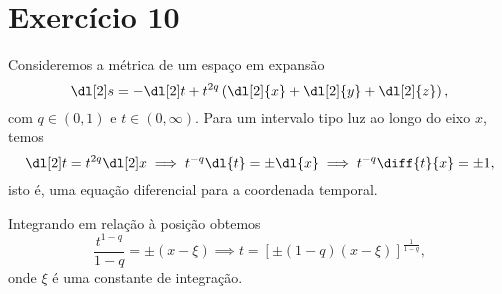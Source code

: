 \section*{Exercício 10}
Consideremos a métrica de um espaço em expansão
\begin{equation*}
    \dl[2]s = - \dl[2]t + t^{2q}\left(\dl[2]{x} + \dl[2]{y} + \dl[2]{z}\right),
\end{equation*}
com \(q \in (0,1)\) e \(t \in (0,\infty)\). Para um intervalo tipo luz ao longo do eixo \(x\), temos
\begin{equation*}
    \dl[2]t = t^{2q}\dl[2]x \implies t^{-q} \dl{t} = \pm\dl{x} \implies t^{-q} \diff{t}{x} = \pm 1,
\end{equation*}
isto é, uma equação diferencial para a coordenada temporal.

Integrando em relação à posição obtemos
\begin{equation*}
    \frac{t^{1-q}}{1-q} = \pm(x - \xi) \implies t = \left[\pm(1-q)(x - \xi)\right]^{\frac{1}{1-q}},
\end{equation*}
onde \(\xi\) é uma constante de integração.
